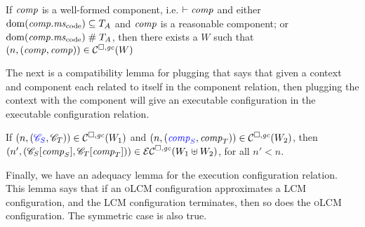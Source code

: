 \documentclass[acmsmall,review,anonymous]{acmart}\settopmatter{printfolios=true,printccs=false,printacmref=false}
\renewcommand{\comp}{\var{comp}}
\newcommand{\wdjud}[2][ ]{#1 \vdash #2}
\newcommand{\trgcm}{\textsc{LCM}}
\newcommand{\srccm}{\textsc{oLCM}}
\begin{document}
\begin{lemma}
  \label{lem:ftlr-comps}
  If $\comp$ is a well-formed component, i.e. $\wdjud{\comp}$ and either
    $\dom(\comp.\mscode) \subseteq \ta$ and $\comp$ is a reasonable component; or
    $\dom(\comp.\mscode) \mathrel{\#} \ta$,
  then there exists a $W$ such that
  $\npair{(\comp,\comp)} \in \lrcomp(W)$
\end{lemma}
The next is a compatibility lemma for plugging that says that given a context and component each related to itself in the component relation, then plugging the context with the component will give an executable configuration in the executable configuration relation.
\begin{lemma}
  \label{lem:compat-context-plug}
  If $\npair{\stpair{\context}{\context}}\in\lrcomp(W_1)$ and $\npair{\stpair{\comp}{\comp}} \in \lrcomp(W_2)$, then
  $\npair[n']{(\plug{\context_S}{\comp_S},\plug{\context_T}{\comp_T})} \in \lrec(W_1 \uplus W_2)$, for all $n' < n$.
\end{lemma}
Finally, we have an adequacy lemma for the execution configuration relation.
This lemma says that if an \srccm{} configuration approximates a \trgcm{} configuration, and the \trgcm{} configuration terminates, then so does the \srccm{} configuration.
The symmetric case is also true.
\end{document}
